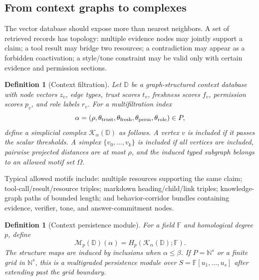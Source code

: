 \documentclass[11pt]{article}
\newtheorem{definition}[theorem]{Definition}
\newcommand{\NN}{\mathbb{N}}
\newcommand{\FF}{\mathbb{F}}
\newcommand{\calK}{\mathcal{K}}
\newcommand{\calM}{\mathcal{M}}
\numberwithin{equation}{section}
\begin{document}
\subsection{From context graphs to complexes}
The vector database should expose more than nearest neighbors. A set of retrieved records has topology: multiple evidence nodes may jointly support a claim; a tool result may bridge two resources; a contradiction may appear as a forbidden coactivation; a style/tone constraint may be valid only with certain evidence and permission sections.

\begin{definition}[Context filtration]
Let $\mathbb{D}$ be a graph-structured context database with node vectors $z_v$, edge types, trust scores $t_v$, freshness scores $f_v$, permission scores $p_v$, and role labels $r_v$. For a multifiltration index
\begin{equation}
\alpha=(\rho,\theta_{\rm trust},\theta_{\rm fresh},\theta_{\rm perm},\theta_{\rm role})\in P,
\end{equation}
define a simplicial complex $\calK_\alpha(\mathbb{D})$ as follows. A vertex $v$ is included if it passes the scalar thresholds. A simplex $\{v_0,\ldots,v_k\}$ is included if all vertices are included, pairwise projected distances are at most $\rho$, and the induced typed subgraph belongs to an allowed motif set $\Omega$.
\end{definition}

Typical allowed motifs include: multiple resources supporting the same claim; tool-call/result/resource triples; markdown heading/child/link triples; knowledge-graph paths of bounded length; and behavior-corridor bundles containing evidence, verifier, tone, and answer-commitment nodes.

\begin{definition}[Context persistence module]
For a field $\FF$ and homological degree $p$, define
\begin{equation}
\calM_p(\mathbb{D})(\alpha)=H_p(\calK_\alpha(\mathbb{D});\FF).
\end{equation}
The structure maps are induced by inclusions when $\alpha\le \beta$. If $P=\NN^s$ or a finite grid in $\NN^s$, this is a multigraded persistence module over $S=\FF[u_1,\ldots,u_s]$ after extending past the grid boundary.
\end{definition}
\end{document}
